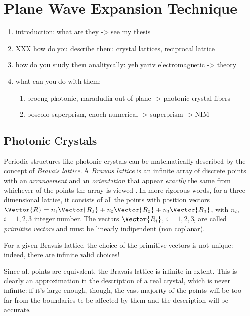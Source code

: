 \chapter{Plane Wave Expansion Technique}

\begin{enumerate}
\item
  introduction: what are they -> see my thesis
\item
  XXX how do you describe them: crystal lattices, reciprocal lattice
\item
  how do you study them analitycally: yeh yariv electromagnetic -> theory
\item
  what can you do with them:
  \begin{enumerate}
    \item
      broeng photonic, maradudin out of plane -> photonic crystal
      fibers
    \item
      boscolo superprism, enoch numerical -> superprism -> NIM
  \end{enumerate}
\end{enumerate}

\section{Photonic Crystals}

Periodic structures like photonic crystals can be matematically
described by the concept of \emph{Bravais lattice}. A \emph{Bravais
  lattice} is an infinite array of discrete points with an
\emph{arrangement} and an \emph{orientation} that appear
\emph{exactly} the same from whichever of the points the array is
viewed . In more rigorous
words, for a three dimensional lattice, it consists of all the points
with position vectors $\Vector{R} = n_1 \Vector{R_1} + n_2
\Vector{R_2} + n_3 \Vector{R_3}$, with $n_i$, $i = 1,2,3$ integer
number. The vectors $\Vector{R_i}$, $i = 1,2,3$, are called
\emph{primitive vectors} and must be linearly indipendent (non
coplanar).

For a given Bravais lattice, the choice of the primitive vectors is
not unique: indeed, there are infinite valid choices!


Since all points are equivalent, the Bravais lattice is infinite in
extent. This is clearly an approximation in the description of a real
crystal, which is never infinite: if it's large enough, though, the
vast majority of the points will be too far from the boundaries to be
affected by them and the description will be accurate.

